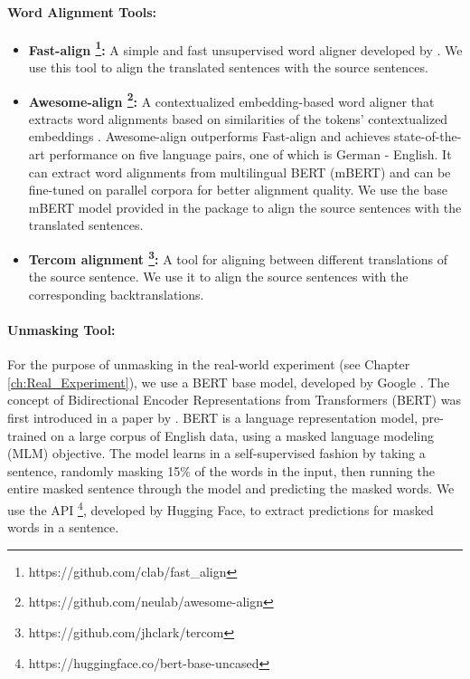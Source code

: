 \paragraph{Word Alignment Tools:}
\begin{itemize}
    \item \textbf{Fast-align \footnote{https://github.com/clab/fast\_align}:} A simple and fast unsupervised word aligner developed by \citet{fast-align}. We use this tool to align the translated sentences with the source sentences.
    \item \textbf{Awesome-align \footnote{https://github.com/neulab/awesome-align}:} A contextualized embedding-based word aligner that extracts word alignments based on similarities of the tokens’ contextualized embeddings \parencite{awesome-align}. Awesome-align outperforms Fast-align and achieves state-of-the-art performance on five language pairs, one of which is German - English. It can extract word alignments from multilingual BERT (mBERT) and can be fine-tuned on parallel corpora for better alignment quality. We use the base mBERT model provided in the package to align the source sentences with the translated sentences.
    \item \textbf{Tercom alignment \footnote{https://github.com/jhclark/tercom}:} A tool for aligning between different translations of the source sentence. We use it to align the source sentences with the corresponding backtranslations.
\end{itemize}

\paragraph{Unmasking Tool:}

For the purpose of unmasking in the real-world experiment (see Chapter \ref{ch:Real_Experiment}), we use a BERT base model, developed by Google \parencite{bert_unmasking}. The concept of Bidirectional Encoder Representations from Transformers (BERT) was first introduced in a paper by \cite{bert}. BERT is a language representation model, pre-trained on a large corpus of English data, using a masked language modeling (MLM) objective. The model learns in a self-supervised fashion by taking a sentence, randomly masking 15\% of the words in the input, then running the entire masked sentence through the model and predicting the masked words. We use the API \footnote{https://huggingface.co/bert-base-uncased}, developed by Hugging Face, to extract predictions for masked words in a sentence.


